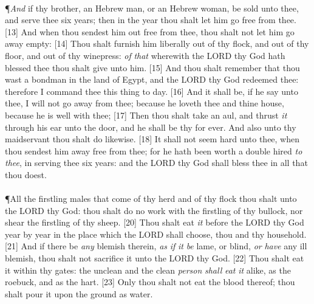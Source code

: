 \\
\P \textcolor[cmyk]{0.99998,1,0,0}{\emph{And} if thy brother, an Hebrew man, or an Hebrew woman, be sold unto thee, and serve thee six years; then in the  year thou shalt let him go free from thee.}
[13] \textcolor[cmyk]{0.99998,1,0,0}{And when thou sendest him out free from thee, thou shalt not let him go away empty:}
[14] \textcolor[cmyk]{0.99998,1,0,0}{Thou shalt furnish him liberally out of thy flock, and out of thy floor, and out of thy winepress: \emph{of} \emph{that} wherewith the LORD thy God hath blessed thee thou shalt give unto him.}
[15] \textcolor[cmyk]{0.99998,1,0,0}{And thou shalt remember that thou wast a bondman in the land of Egypt, and the LORD thy God redeemed thee: therefore I command thee this thing to day.}
[16] \textcolor[cmyk]{0.99998,1,0,0}{And it shall be, if he say unto thee, I will not go away from thee; because he loveth thee and thine house, because he is well with thee;}
[17] \textcolor[cmyk]{0.99998,1,0,0}{Then thou shalt take an aul, and thrust \emph{it} through his ear unto the door, and he shall be thy  for ever. And also unto thy maidservant thou shalt do likewise.}
[18] \textcolor[cmyk]{0.99998,1,0,0}{It shall not seem hard unto thee, when thou sendest him away free from thee; for he hath been worth a double hired  \emph{to} \emph{thee}, in serving thee six years: and the LORD thy God shall bless thee in all that thou doest.}\\
\\
\P \textcolor[cmyk]{0.99998,1,0,0}{All the firstling males that come of thy herd and of thy flock thou shalt  unto the LORD thy God: thou shalt do no work with the firstling of thy bullock, nor shear the firstling of thy sheep.}
[20] \textcolor[cmyk]{0.99998,1,0,0}{Thou shalt eat \emph{it} before the LORD thy God year by year in the place which the LORD shall choose, thou and thy household.}
[21] \textcolor[cmyk]{0.99998,1,0,0}{And if there be \emph{any} blemish therein, \emph{as} \emph{if} \emph{it} \emph{be} lame, or blind, \emph{or} \emph{have} any ill blemish, thou shalt not sacrifice it unto the LORD thy God.}
[22] \textcolor[cmyk]{0.99998,1,0,0}{Thou shalt eat it within thy gates: the unclean and the clean \emph{person} \emph{shall} \emph{eat} \emph{it} alike, as the roebuck, and as the hart.}
[23] \textcolor[cmyk]{0.99998,1,0,0}{Only thou shalt not eat the blood thereof; thou shalt pour it upon the ground as water.}